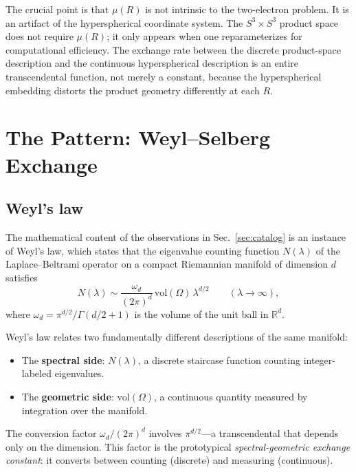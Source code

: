 \documentclass[aps,pra,twocolumn,superscriptaddress,longbibliography]{revtex4-2}
\begin{document}
The crucial point is that $\mu(R)$ is not intrinsic to the
two-electron problem.  It is an artifact of the hyperspherical
coordinate system.  The $S^3 \times S^3$ product space does not
require $\mu(R)$; it only appears when one reparameterizes for
computational efficiency.  The exchange rate between the discrete
product-space description and the continuous hyperspherical
description is an entire transcendental function, not merely
a constant, because the hyperspherical embedding distorts the
product geometry differently at each $R$.



\section{The Pattern: Weyl--Selberg Exchange}
\label{sec:pattern}

\subsection{Weyl's law}

The mathematical content of the observations in
Sec.~\ref{sec:catalog} is an instance of Weyl's law, which
states that the eigenvalue counting function $N(\lambda)$ of
the Laplace--Beltrami operator on a compact Riemannian manifold
of dimension $d$ satisfies~\cite{weyl1911}
\begin{equation}
  N(\lambda) \sim \frac{\omega_d}{(2\pi)^d}\,
  \mathrm{vol}(\Omega)\,\lambda^{d/2}
  \qquad (\lambda \to \infty),
  \label{eq:weyl}
\end{equation}
where $\omega_d = \pi^{d/2}/\Gamma(d/2+1)$ is the volume of
the unit ball in $\mathbb{R}^d$.

Weyl's law relates two fundamentally different descriptions
of the same manifold:
\begin{itemize}
  \item The \textbf{spectral side}: $N(\lambda)$, a discrete
    staircase function counting integer-labeled eigenvalues.
  \item The \textbf{geometric side}: $\mathrm{vol}(\Omega)$, a
    continuous quantity measured by integration over the manifold.
\end{itemize}
The conversion factor $\omega_d / (2\pi)^d$ involves
$\pi^{d/2}$---a transcendental that depends only on the
dimension.  This factor is the prototypical
\textit{spectral-geometric exchange constant}: it converts
between counting (discrete) and measuring (continuous).
\end{document}
